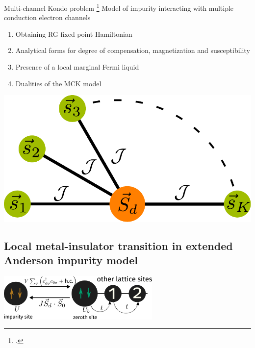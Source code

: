\documentclass[11pt,aspectratio=169]{beamer}
\begin{document}
\begin{frame}{Multi-channel Kondo problem}
\footcite{Noz_blandin_1980,Tsvelick_weigmann_mchannel_1985,affleck1993exact,Gan_mchannel_1994,affleck_1991_overscreen,emery_kivelson,bulla_1998}
Model of impurity interacting with multiple conduction electron channels \\[20pt]

\begin{minipage}{0.59\textwidth}
	\begin{enumerate}
		\item Obtaining RG fixed point Hamiltonian\\[20pt]
	\item Analytical forms for degree of compensation, magnetization and susceptibility\\[20pt]
	\item Presence of a local marginal Fermi liquid\\[20pt]
	\item Dualities of the MCK model
\end{enumerate}
\end{minipage}
\begin{minipage}{0.4\textwidth}
	\includegraphics[width=\textwidth]{stargraph.pdf}
\end{minipage}

\end{frame}

\begin{frame}{}
\section{Local metal-insulator transition in extended Anderson impurity model}
\vspace*{\fill}
\includegraphics[width=0.6\textwidth]{zeromode_bare.pdf}
\end{frame}
\end{document}
